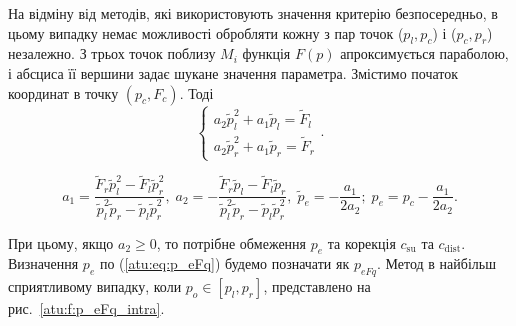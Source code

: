 \documentclass[a4paper,13pt]{atuaref}
\begin{document}
На відміну від методів, які використовують значення критерію безпосередньо, в
цьому випадку немає можливості обробляти кожну з пар точок ($ p_l, p_c $) і
($p_c, p_r $) незалежно. З трьох точок поблизу $ M_ {i} $ функція $ F (p) $
апроксимується параболою, і абсциса її вершини задає шукане значення параметра.
Змістимо початок координат в точку
$ ( p_c, F_c ) $. Тоді
\[
  \left\{
    \begin{array}{l}
      a_2 \tilde{p}_l^2 + a_1 \tilde{p}_l  = \tilde{F}_l
      \\
      a_2 \tilde{p}_r^2 + a_1 \tilde{p}_r  = \tilde{F}_r
    \end{array}
  \right. .
\]
%
%

\begin{equation}
   a_1 = \frac{\tilde{F}_r \tilde{p}_l^2 - \tilde{F}_l \tilde{p}_r^2 }
              { \tilde{p}_l^2 \tilde{p}_r  - \tilde{p}_l \tilde{p}_r^2 },
  \;
  a_2 = - \frac{\tilde{F}_r \tilde{p}_l - \tilde{F}_l \tilde{p}_r }
               { \tilde{p}_l^2 \tilde{p}_r  - \tilde{p}_l \tilde{p}_r^2 },
  \;
  \tilde{p}_e = - \frac{a_1}{2 a_2};
  \;
  p_e = p_c - \frac{a_1}{2 a_2}.
  \label{atu:eq:p_eFq}
\end{equation}

При цьому, якщо
$ a_2 \ge 0 $,
то потрібне обмеження $p_e$ та корекція $c_\mathrm{su}$ та $c_\mathrm{dist}$.
Визначення $ p_e $ по (\ref{atu:eq:p_eFq}) будемо позначати як $p_{eFq}$.
Метод в найбільш сприятливому випадку, коли
$p_o \in [p_l,p_r]$, представлено на рис.~\ref{atu:f:p_eFq_intra}.
\end{document}
